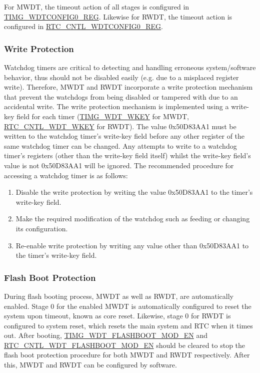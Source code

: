 \documentclass[main\_\_EN.tex]{subfiles}
\begin{document}
For MWDT, the timeout action of all stages is configured in \hyperref[regdesc:TIMGWDTCONFIG0REG]{TIMG\_WDTCONFIG0\_REG}. Likewise for RWDT, the timeout action is configured in \hyperref[regdesc:RTCCNTLWDTCONFIG0REG]{RTC\_CNTL\_WDTCONFIG0\_REG}.

\subsubsection{Write Protection}
Watchdog timers are critical to detecting and handling erroneous system/software behavior, thus should not be disabled easily (e.g. due to a misplaced register write). Therefore, MWDT and RWDT incorporate a write protection mechanism that prevent the watchdogs from being disabled or tampered with due to an accidental write.
The write protection mechanism is implemented using a write-key field for each timer (\hyperref[fielddesc:TIMGWDTWKEY]{TIMG\_WDT\_WKEY} for  MWDT, \hyperref[fielddesc:RTCCNTLWDTWKEY]{RTC\_CNTL\_WDT\_WKEY} for RWDT). The value 0x50D83AA1 must be written to the watchdog timer's write-key field before any other register of the same watchdog timer can be changed. Any attempts to write to a watchdog timer's registers (other than the write-key field itself) whilst the write-key field's value is not 0x50D83AA1 will be ignored. The recommended procedure for accessing a watchdog timer is as follows:
\begin{enumerate}
\item Disable the write protection by writing the value 0x50D83AA1 to the timer's write-key field.
\item Make the required modification of the watchdog such as feeding or changing its configuration.
\item Re-enable write protection by writing any value other than 0x50D83AA1 to the timer's write-key field.
\end{enumerate}

\subsubsection{Flash Boot Protection}
During flash booting process, MWDT as well as RWDT, are automatically enabled. Stage 0 for the enabled MWDT is automatically configured to reset the system upon timeout, known as core reset. Likewise, stage 0 for RWDT is configured to system reset, which resets the main system and RTC when it times out. After booting, \hyperref[fielddesc:TIMGWDTFLASHBOOTMODEN]{TIMG\_WDT\_FLASHBOOT\_MOD\_EN} and \hyperref[fielddesc:RTCCNTLWDTFLASHBOOTMODEN]{RTC\_CNTL\_WDT\_FLASHBOOT\_MOD\_EN}  should be cleared to stop the flash boot protection procedure for both MWDT and RWDT respectively. After this, MWDT and RWDT can be configured by software.
\end{document}
